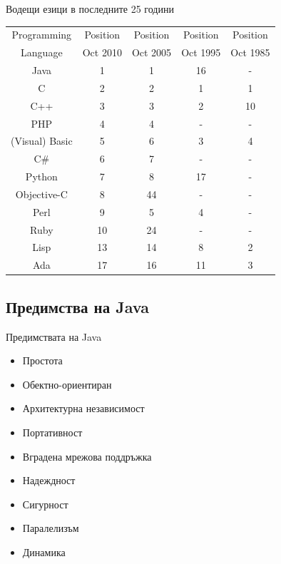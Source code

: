 \documentclass{beamer}
\begin{document}
\begin{frame}{Водещи езици в последните 25 години}
  \transdissolve
  \begin{tabular}{|c|c|c|c|c|}
    \hline
    Programming & Position & Position & Position & Position \\
    Language    & Oct 2010 & Oct 2005 & Oct 1995 & Oct 1985 \\
    \hline
    \hline
    Java        & 1        & 1        & 16       & -        \\
    \hline
    C           & 2        & 2        & 1        & 1        \\
    \hline
    C++         & 3        & 3        & 2        & 10       \\
    \hline
    PHP         & 4        & 4        & -        & -        \\
    \hline   
    (Visual) Basic & 5     & 6        & 3        & 4        \\
    \hline
    C\#         & 6        & 7        & -        & -        \\
    \hline
    Python      & 7        & 8        & 17       & -        \\
    \hline
    Objective-C & 8        & 44       & -        & -        \\
    \hline
    Perl        & 9        & 5        & 4        & -        \\
    \hline      
    Ruby        & 10       & 24       & -        & -        \\
    \hline 
    Lisp        & 13       & 14       & 8        & 2        \\
    \hline
    Ada         & 17       & 16       & 11       & 3        \\
    \hline
  \end{tabular}
\end{frame}

\subsection{Предимства на Java}
\begin{frame}{Предимствата на Java}
  \transdissolve
  \begin{itemize}
  \item Простота
  \item Обектно-ориентиран
  \item Архитектурна независимост
  \item Портативност
  \item Вградена мрежова поддръжка
  \item Надеждност
  \item Сигурност
  \item Паралелизъм
  \item Динамика
  \end{itemize}
\end{frame}
\end{document}
